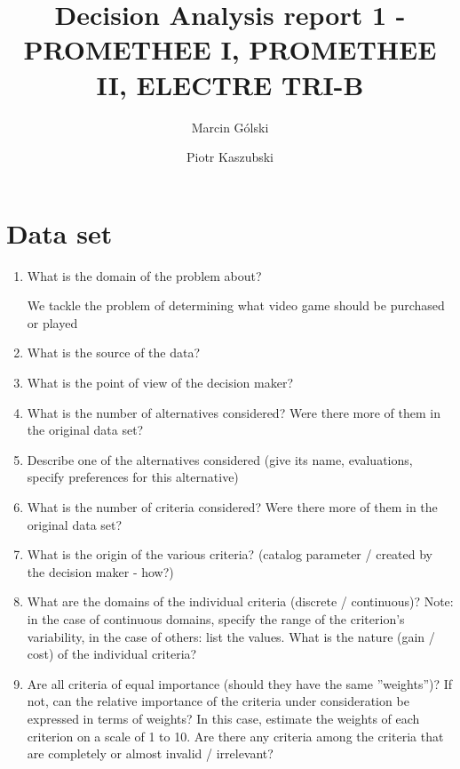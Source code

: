 \documentclass{article}
\author{Marcin Gólski \and Piotr Kaszubski}
\title{Decision Analysis report 1 - PROMETHEE I, PROMETHEE II, ELECTRE TRI-B}
\begin{document}
\maketitle

\section{Data set}

\begin{enumerate}

    \item What is the domain of the problem about?

    We tackle the problem of determining what video game should be purchased or played

    \item What is the source of the data?

    \item What is the point of view of the decision maker?

    \item What is the number of alternatives considered? Were there more of them in the original data set?

    \item Describe one of the alternatives considered (give its name, evaluations, specify preferences for this alternative)

    \item What is the number of criteria considered? Were there more of them in the original data set?

    \item What is the origin of the various criteria?
    (catalog parameter / created by the decision maker - how?)

    \item What are the domains of the individual criteria (discrete / continuous)? Note: in the case of continuous
    domains, specify the range of the criterion's variability, in the case of others: list the values. What is
    the nature (gain / cost) of the individual criteria?

    \item Are all criteria of equal importance (should they have the same ”weights”)? If not, can the relative
    importance of the criteria under consideration be expressed in terms of weights? In this case, estimate
    the weights of each criterion on a scale of 1 to 10. Are there any criteria among the criteria that are
    completely or almost invalid / irrelevant?


\end{enumerate}
\end{document}
